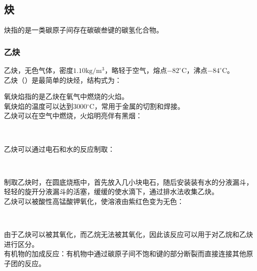 \documentclass[UTF8]{ctexart}
\begin{document}
\newpage

\subsection{炔}
    炔指的是一类碳原子间存在碳碳叁键的碳氢化合物。

\subsubsection{乙炔}
    乙炔，无色气体，密度$1.10\text{kg}/\text{m}^3$，略轻于空气，熔点$-82^\circ$C，沸点$-84^\circ$C。\\[3mm]
    乙炔（）是最简单的炔烃，结构式为：\vspace{5pt}
    \begin{center}
    \end{center}\vspace{10pt}
    氧炔焰指的是乙炔在氧气中燃烧的火焰。\\[3mm]
    氧炔焰的温度可以达到3000$^\circ$C，常用于金属的切割和焊接。\\[3mm]
    乙炔可以在空气中燃烧，火焰明亮伴有黑烟：
    \begin{center}
        \\[3mm]
    \end{center}
    乙炔可以通过电石和水的反应制取：
    \begin{center}
        \\[5mm]
    \end{center}
    制取乙炔时，在圆底烧瓶中，首先放入几小块电石，随后安装装有水的分液漏斗，
    轻轻的旋开分液漏斗的活塞，缓缓的使水滴下，通过排水法收集乙炔。\\[6mm]
    乙炔可以被酸性高锰酸钾氧化，使溶液由紫红色变为无色：\vspace{2pt}
    \begin{center}
        \\[4mm]
    \end{center}
    由于乙炔可以被其氧化，而乙烷无法被其氧化，因此该反应可以用于对乙烷和乙炔进行区分。\\[10mm]
    有机物的加成反应：有机物中通过碳原子间不饱和键的部分断裂而直接连接其他原子团的反应。\\[3mm]
\end{document}
